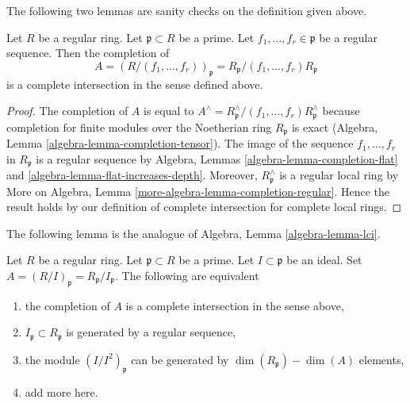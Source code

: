 \noindent
The following two lemmas are sanity checks on the definition given above.

\begin{lemma}
\label{lemma-quotient-regular-ring-by-regular-sequence}
Let $R$ be a regular ring. Let $\mathfrak p \subset R$ be a prime.
Let $f_1, \ldots, f_r \in \mathfrak p$ be a regular sequence.
Then the completion of
$$
A = (R/(f_1, \ldots, f_r))_\mathfrak p =
R_\mathfrak p/(f_1, \ldots, f_r)R_\mathfrak p
$$
is a complete intersection in the sense defined above.
\end{lemma}

\begin{proof}
The completion of $A$ is equal to
$A^\wedge = R_\mathfrak p^\wedge/(f_1, \ldots, f_r)R_\mathfrak p^\wedge$
because completion for finite modules over the Noetherian ring
$R_\mathfrak p$ is exact
(Algebra, Lemma \ref{algebra-lemma-completion-tensor}).
The image of the sequence $f_1, \ldots, f_r$ in $R_\mathfrak p$
is a regular sequence by
Algebra, Lemmas \ref{algebra-lemma-completion-flat} and
\ref{algebra-lemma-flat-increases-depth}.
Moreover, $R_\mathfrak p^\wedge$ is a regular local ring by
More on Algebra, Lemma \ref{more-algebra-lemma-completion-regular}.
Hence the result holds by our definition of complete
intersection for complete local rings.
\end{proof}

\noindent
The following lemma is the analogue of Algebra, Lemma \ref{algebra-lemma-lci}.

\begin{lemma}
\label{lemma-quotient-regular-ring}
Let $R$ be a regular ring. Let $\mathfrak p \subset R$ be a prime.
Let $I \subset \mathfrak p$ be an ideal.
Set $A = (R/I)_\mathfrak p = R_\mathfrak p/I_\mathfrak p$.
The following are equivalent
\begin{enumerate}
\item the completion of $A$
is a complete intersection in the sense above,
\item $I_\mathfrak p \subset R_\mathfrak p$ is generated
by a regular sequence,
\item the module $(I/I^2)_\mathfrak p$ can be generated by
$\dim(R_\mathfrak p) - \dim(A)$ elements,
\item add more here.
\end{enumerate}
\end{lemma}

